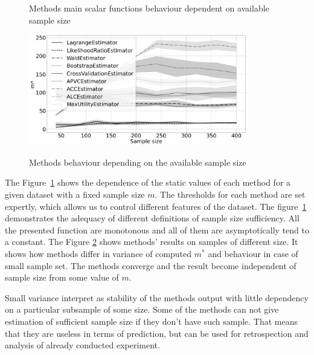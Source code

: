 \documentclass[
11pt,%
tightenlines,%
twoside,%
onecolumn,%
nofloats,%
nobibnotes,%
nofootinbib,%
superscriptaddress,%
noshowpacs,%
centertags]%
{revtex4}
\begin{document}
\begin{figure}[h!t]
    \caption{Methods main scalar functions behaviour dependent on available sample size}
    \label{fig1}
\end{figure}

\begin{figure}[h!t]\center
    {\includegraphics[width=0.85\textwidth]{graphs.png}}
    \caption{Methods behaviour depending on the available sample size}
    \label{fig2}
\end{figure}
    
The Figure~\ref{fig1} shows the dependence of the static values of each method for a given dataset with a fixed sample size $m$. The thresholds for each method are set expertly, which allows us to control different features of the dataset. The figure~\ref{fig1} demonstrates the adequacy of different definitions of sample size sufficiency. All the presented function are monotonous and all of them are asymptotically tend to a constant.
The Figure \ref{fig2} shows methods' results on samples of different size. It shows how methods differ in variance of computed $m^*$ and behaviour in case of small sample set. The methods converge and the result become independent of sample size from some value of $m$. 
    
Small variance interpret as stability of the methods output with little dependency on a particular subsample of some size. Some of the methods can not give estimation of sufficient sample size if they don't have such sample. That means that they are useless in terms of prediction, but can be used for retrospection and analysis of already conducted experiment.
\end{document}
